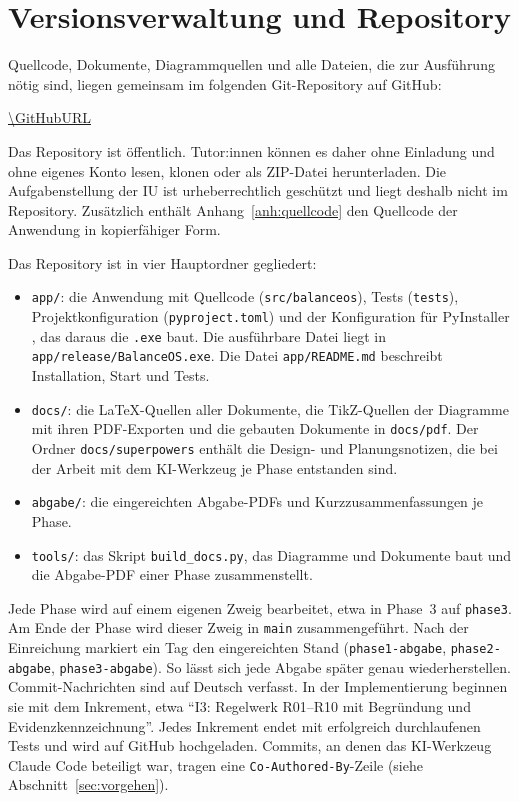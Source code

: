 \section{Versionsverwaltung und Repository}\label{sec:versionsverwaltung}
Quellcode, Dokumente, Diagrammquellen und alle Dateien, die zur Ausführung nötig sind, liegen gemeinsam im folgenden Git-Repository auf GitHub:

\url{\GitHubURL}

Das Repository ist öffentlich. Tutor:innen können es daher ohne Einladung und ohne eigenes Konto lesen, klonen oder als ZIP-Datei herunterladen. Die Aufgabenstellung der IU ist urheberrechtlich geschützt und liegt deshalb nicht im Repository. Zusätzlich enthält Anhang~\ref{anh:quellcode} den Quellcode der Anwendung in kopierfähiger Form.

Das Repository ist in vier Hauptordner gegliedert:
\begin{itemize}
  \item \texttt{app/}: die Anwendung mit Quellcode (\texttt{src/balanceos}), Tests (\texttt{tests}), Projektkonfiguration (\texttt{pyproject.toml}) und der Konfiguration für PyInstaller \parencite{pyinstaller}, das daraus die \texttt{.exe} baut. Die ausführbare Datei liegt in \texttt{app/release/BalanceOS.exe}. Die Datei \texttt{app/README.md} beschreibt Installation, Start und Tests.
  \item \texttt{docs/}: die \LaTeX-Quellen aller Dokumente, die TikZ-Quellen der Diagramme mit ihren PDF-Exporten und die gebauten Dokumente in \texttt{docs/pdf}. Der Ordner \texttt{docs/superpowers} enthält die Design- und Planungsnotizen, die bei der Arbeit mit dem \ac{KI}-Werkzeug je Phase entstanden sind.
  \item \texttt{abgabe/}: die eingereichten Abgabe-PDFs und Kurzzusammenfassungen je Phase.
  \item \texttt{tools/}: das Skript \texttt{build\_docs.py}, das Diagramme und Dokumente baut und die Abgabe-PDF einer Phase zusammenstellt.
\end{itemize}

Jede Phase wird auf einem eigenen Zweig bearbeitet, etwa in Phase~3 auf \texttt{phase3}. Am Ende der Phase wird dieser Zweig in \texttt{main} zusammengeführt. Nach der Einreichung markiert ein Tag den eingereichten Stand (\texttt{phase1-abgabe}, \texttt{phase2-abgabe}, \texttt{phase3-abgabe}). So lässt sich jede Abgabe später genau wiederherstellen. Commit-Nachrichten sind auf Deutsch verfasst. In der Implementierung beginnen sie mit dem Inkrement, etwa \enquote{I3: Regelwerk R01--R10 mit Begründung und Evidenzkennzeichnung}. Jedes Inkrement endet mit erfolgreich durchlaufenen Tests und wird auf GitHub hochgeladen. Commits, an denen das \ac{KI}-Werkzeug Claude Code beteiligt war, tragen eine \texttt{Co-Authored-By}-Zeile (siehe Abschnitt~\ref{sec:vorgehen}).
